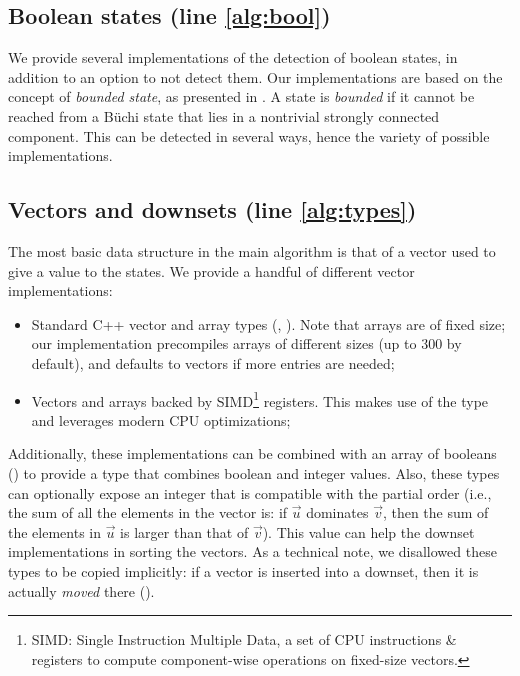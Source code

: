 \documentclass[sigconf,screen,nonacm]{acmart}
\begin{document}
\subsection{Boolean states (line \ref{alg:bool})}\label{sec:implem-bool}

We provide several implementations of the detection of boolean states, in
addition to an option to not detect them.  Our implementations are based on the
concept of \emph{bounded state}, as presented in \cite{bohy14}.  A state is
\emph{bounded} if it cannot be reached from a Büchi state that lies in a
nontrivial strongly connected component.  This 
can be detected in
several ways, hence the variety of possible implementations.

\subsection{Vectors and downsets (line \ref{alg:types})}

The most basic data structure in the main algorithm is that of a vector used to
give a value to the states.  We provide a handful of different vector
implementations:
\begin{itemize}
\item Standard C++ vector and array types (,\linebreak
  ).  Note that arrays are of fixed size; our implementation
  precompiles arrays of different sizes (up to \(300\) by default),
  and defaults to vectors if more entries are needed;
\item Vectors and arrays backed by SIMD\footnote{SIMD: Single Instruction
    Multiple Data, a set of CPU instructions \& registers to compute
    component-wise operations on fixed-size vectors.} registers.  This makes use of the
   type and leverages modern CPU optimizations;
\end{itemize}

Additionally, these implementations can be combined with an array of booleans
() to provide a type that combines boolean and integer
values.  Also, these types can optionally expose an integer that is compatible
with the partial order (i.e., the sum of all the elements in the vector
is: if \(\vec{u}\) dominates \(\vec{v}\), then the sum of the elements in \(\vec{u}\)
is larger than that of \(\vec{v}\)).  This value can help the downset
implementations in sorting the vectors.  As a technical note, we disallowed
these types to be copied implicitly: if a vector is inserted into a downset,
then it is actually \emph{moved} there ().
\end{document}
